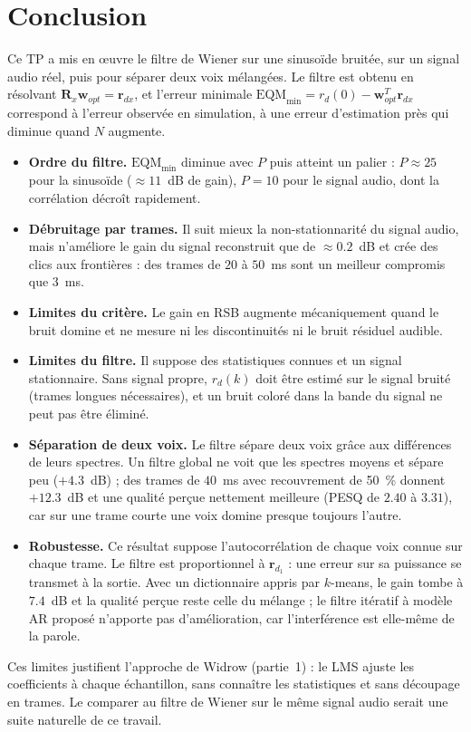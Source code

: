 \section{Conclusion}

Ce TP a mis en œuvre le filtre de Wiener sur une sinusoïde bruitée, sur un signal audio réel, puis pour séparer deux voix mélangées. Le filtre est obtenu en résolvant $\mathbf{R}_x\mathbf{w}_{opt}=\mathbf{r}_{dx}$, et l'erreur minimale $\mathrm{EQM}_{\min}=r_d(0)-\mathbf{w}_{opt}^T\mathbf{r}_{dx}$ correspond à l'erreur observée en simulation, à une erreur d'estimation près qui diminue quand $N$ augmente.

\begin{interpretation}
\begin{itemize}
  \item \textbf{Ordre du filtre.} $\mathrm{EQM}_{\min}$ diminue avec $P$ puis atteint un palier : $P\approx 25$ pour la sinusoïde ($\approx 11$~dB de gain), $P=10$ pour le signal audio, dont la corrélation décroît rapidement.
  \item \textbf{Débruitage par trames.} Il suit mieux la non-stationnarité du signal audio, mais n'améliore le gain du signal reconstruit que de $\approx 0.2$~dB et crée des clics aux frontières : des trames de $20$ à $50$~ms sont un meilleur compromis que $3$~ms.
  \item \textbf{Limites du critère.} Le gain en RSB augmente mécaniquement quand le bruit domine et ne mesure ni les discontinuités ni le bruit résiduel audible.
  \item \textbf{Limites du filtre.} Il suppose des statistiques connues et un signal stationnaire. Sans signal propre, $r_d(k)$ doit être estimé sur le signal bruité (trames longues nécessaires), et un bruit coloré dans la bande du signal ne peut pas être éliminé.
  \item \textbf{Séparation de deux voix.} Le filtre sépare deux voix grâce aux différences de leurs spectres. Un filtre global ne voit que les spectres moyens et sépare peu ($+4.3$~dB) ; des trames de $40$~ms avec recouvrement de 50~\% donnent $+12.3$~dB et une qualité perçue nettement meilleure (PESQ de $2.40$ à $3.31$), car sur une trame courte une voix domine presque toujours l'autre.
  \item \textbf{Robustesse.} Ce résultat suppose l'autocorrélation de chaque voix connue sur chaque trame. Le filtre est proportionnel à $\mathbf{r}_{d_1}$ : une erreur sur sa puissance se transmet à la sortie. Avec un dictionnaire appris par $k$-means, le gain tombe à $7.4$~dB et la qualité perçue reste celle du mélange ; le filtre itératif à modèle AR proposé n'apporte pas d'amélioration, car l'interférence est elle-même de la parole.
\end{itemize}
\end{interpretation}

Ces limites justifient l'approche de Widrow (partie~1) : le LMS ajuste les coefficients à chaque échantillon, sans connaître les statistiques et sans découpage en trames. Le comparer au filtre de Wiener sur le même signal audio serait une suite naturelle de ce travail.
